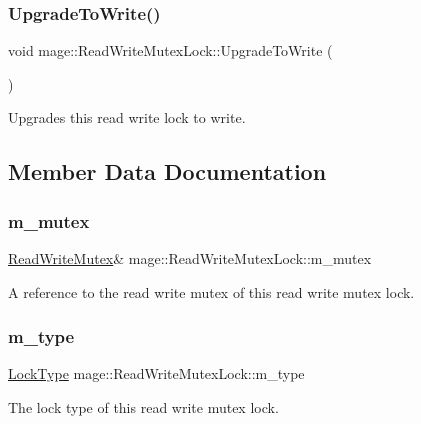 \subsubsection{\texorpdfstring{Upgrade\+To\+Write()}{UpgradeToWrite()}}
{\footnotesize\ttfamily void mage\+::\+Read\+Write\+Mutex\+Lock\+::\+Upgrade\+To\+Write (\begin{DoxyParamCaption}{ }\end{DoxyParamCaption})\hspace{0.3cm}{\ttfamily [noexcept]}}

Upgrades this read write lock to write. 

\subsection{Member Data Documentation}
\hypertarget{classmage_1_1_read_write_mutex_lock_a6ee9034fa984e11ec07c20ec77ab1bfe}{}\label{classmage_1_1_read_write_mutex_lock_a6ee9034fa984e11ec07c20ec77ab1bfe} 
\subsubsection{\texorpdfstring{m\+\_\+mutex}{m\_mutex}}
{\footnotesize\ttfamily \hyperlink{classmage_1_1_read_write_mutex}{Read\+Write\+Mutex}\& mage\+::\+Read\+Write\+Mutex\+Lock\+::m\+\_\+mutex\hspace{0.3cm}{\ttfamily [private]}}

A reference to the read write mutex of this read write mutex lock. \hypertarget{classmage_1_1_read_write_mutex_lock_a754d235c4ba2f8f8da51342ad497a735}{}\label{classmage_1_1_read_write_mutex_lock_a754d235c4ba2f8f8da51342ad497a735} 
\subsubsection{\texorpdfstring{m\+\_\+type}{m\_type}}
{\footnotesize\ttfamily \hyperlink{classmage_1_1_read_write_mutex_lock_a5fee0529edf58803ee1f5d4afa084a3b}{Lock\+Type} mage\+::\+Read\+Write\+Mutex\+Lock\+::m\+\_\+type\hspace{0.3cm}{\ttfamily [private]}}

The lock type of this read write mutex lock. 